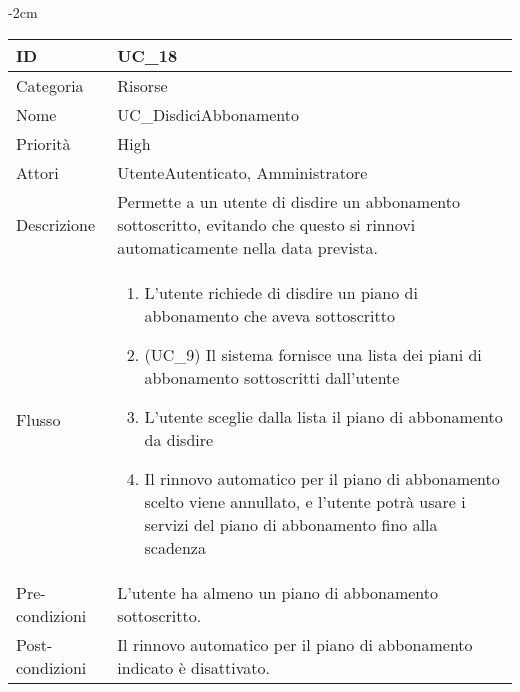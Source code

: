 \begin{center}
\begin{table}[bp]
    \centering
    \addtolength{\leftskip} {-2cm}
\begin{tabular}{ |p{2.6cm}|p{13cm}|  }
\hline
ID & UC\_18 \\\hline
Categoria & Risorse\\\hline
Nome & UC\_DisdiciAbbonamento\\\hline
Priorità & High \\\hline
Attori &  UtenteAutenticato, Amministratore \\\hline
Descrizione & Permette a un utente di disdire un abbonamento sottoscritto, evitando che questo si rinnovi automaticamente nella data prevista.\\\hline
Flusso &  	\vspace{-5mm} \begin{enumerate}
			\item L'utente richiede di disdire un piano di abbonamento che aveva sottoscritto
			\item (UC\_9) Il sistema fornisce una lista dei piani di abbonamento sottoscritti dall'utente
			\item L'utente sceglie dalla lista il piano di abbonamento da disdire
			\item Il rinnovo automatico per il piano di abbonamento scelto viene annullato, e l'utente potrà usare i servizi del piano di abbonamento fino alla scadenza
		\end{enumerate}\\\hline
Pre-condizioni & L'utente ha almeno un piano di abbonamento sottoscritto.\\\hline
Post-condizioni &  Il rinnovo automatico per il piano di abbonamento indicato è disattivato.\\\hline
\end{tabular}
\label{table_use_case:18}\newline
\end{table}


\end{center}
